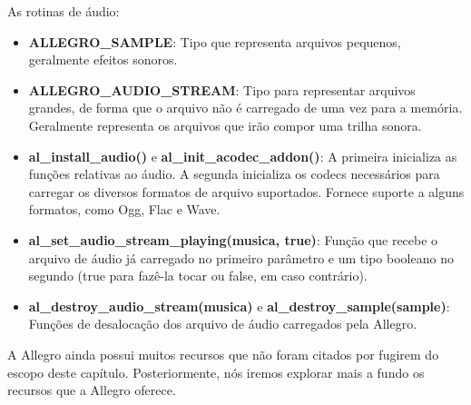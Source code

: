 % 
As rotinas de áudio:
%
\begin{itemize}
 \item \textbf{ALLEGRO\_SAMPLE}: Tipo que representa arquivos pequenos, geralmente efeitos sonoros.
 \item \textbf{ALLEGRO\_AUDIO\_STREAM}: Tipo para representar arquivos grandes, de forma que o arquivo não é carregado de uma vez para a 
 memória. Geralmente representa os arquivos que irão compor uma trilha sonora.
 \item \textbf{al\_install\_audio()} e \textbf{al\_init\_acodec\_addon()}: A primeira inicializa as funções relativas ao áudio. A segunda inicializa os 
 codecs necessários para carregar os diversos formatos de arquivo suportados. Fornece suporte a alguns formatos, como Ogg, Flac e Wave.
 \item \textbf{al\_set\_audio\_stream\_playing(musica, true)}: Função que recebe o arquivo de áudio já carregado no primeiro parâmetro e um tipo 
 booleano no segundo (true para fazê-la tocar ou false, em caso contrário).
 \item \textbf{al\_destroy\_audio\_stream(musica) } e \textbf{al\_destroy\_sample(sample)}: Funções de desalocação dos arquivo de áudio carregados 
 pela Allegro.
\end{itemize}
%
%
A Allegro ainda possui muitos recursos que não foram citados por fugirem do escopo deste capítulo. Posteriormente,
nós iremos explorar mais a fundo os recursos que a Allegro oferece.
%
%
